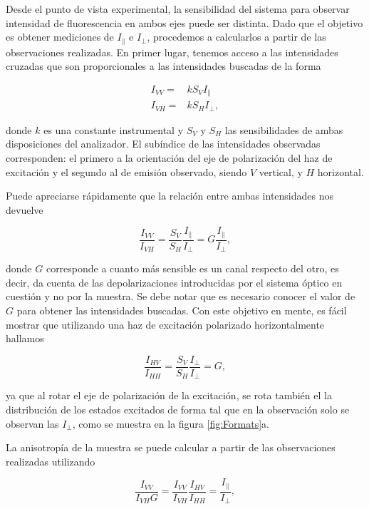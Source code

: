 Desde el punto de vista experimental, la sensibilidad del sistema para observar intensidad de fluorescencia en ambos ejes puede ser distinta. Dado que el objetivo es obtener mediciones de $I_{\parallel}$ e $I_{\perp}$, procedemos a calcularlos a partir de las observaciones realizadas. En primer lugar, tenemos acceso a las intensidades cruzadas que son proporcionales a las intensidades buscadas de la forma

\begin{align}
    I_{VV} =& k S_V I_{\parallel} \\
    I_{VH} =& k S_H I_{\perp},
\end{align}

\noindent donde $k$ es una constante instrumental y $S_V$ y $S_H$ las sensibilidades de ambas disposiciones del analizador. El subíndice de las intensidades observadas corresponden: el primero a la orientación del eje de polarización del haz de excitación y el segundo al de emisión observado, siendo $V$ vertical, y $H$ horizontal.

Puede apreciarse rápidamente que la relación entre ambas intensidades nos devuelve

\begin{equation}
    \frac{I_{VV}}{I_{VH}} = \frac{S_V}{S_H} \frac{I_{\parallel}}{I_{\perp}} = G \frac{I_{\parallel}}{I_{\perp}},
\end{equation}

\noindent donde $G$ corresponde a cuanto más sensible es un canal respecto del otro, es decir, da cuenta de las depolarizaciones introducidas por el sistema óptico en cuestión y no por la muestra. Se debe notar que es necesario conocer el valor de $G$ para obtener las intensidades buscadas. Con este objetivo en mente, es fácil mostrar que utilizando una haz de excitación polarizado horizontalmente hallamos

\begin{equation}
    \frac{I_{HV}}{I_{HH}} = \frac{S_V}{S_H} \frac{I_{\perp}}{I_{\perp}} = G,
\end{equation}

\noindent ya que al rotar el eje de polarización de la excitación, se rota también el la distribución de los estados excitados de forma tal que en la observación solo se observan las $I_{\perp}$, como se muestra en la figura \ref{fig:Formats}a.

La anisotropía de la muestra se puede calcular a partir de las observaciones realizadas utilizando

\begin{equation}
    \frac{I_{VV}}{I_{VH} G} = \frac{I_{VV}}{I_{VH}} \frac{I_{HV}}{I_{HH}} = \frac{I_{\parallel}}{I_{\perp}},
\end{equation}

